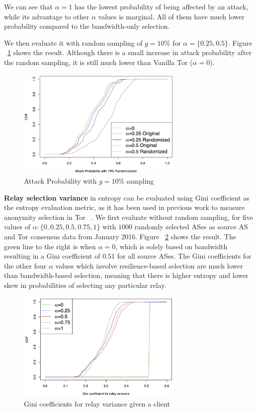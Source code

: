 We can see that $\alpha=1$ has the lowest probability of being affected by an attack, while its advantage to other $\alpha$ values is marginal. All of them have much lower probability compared to the bandwidth-only selection. 

We then evaluate it with random sampling of $g=10\%$ for $\alpha=\{0.25, 0.5\}$. Figure ~\ref{fig_attack_random} shows the result. Although there is a small increase in attack probability after the random sampling, it is still much lower than Vanilla Tor ($\alpha=0$). 

\begin{figure}[ht!]
\centering
\includegraphics[width=80mm]{figure/attack_randomize}
\caption{Attack Probability with $g=10\%$ sampling \label{fig_attack_random}}
\end{figure}

\textbf{Relay selection variance} in entropy can be evaluated using Gini coefficient as the entropy evaluation metric, as it has been used in previous work to measure anonymity selection in Tor ~\cite{akhoondi2012lastor}. We first evaluate without  random sampling, for five values of $\alpha: \{0, 0.25, 0.5, 0.75, 1\}$ with $1000$ randomly selected ASes as source AS and Tor consensus data from January 2016. Figure ~\ref{fig_gini} shows the result. The green line to the right is when $\alpha = 0$, which is solely based on bandwidth resulting in a Gini coefficient of $0.51$ for all source ASes. The Gini coefficients for the other four $\alpha$ values which involve resilience-based selection are much lower than bandwidth-based selection, meaning that there is higher entropy and lower skew in probabilities of selecting any particular relay.

\begin{figure}[ht!]
\centering
\includegraphics[width=80mm]{figure/gini_relay_variance}
\caption{Gini coefficients for relay variance given a client \label{fig_gini}}
\end{figure}

